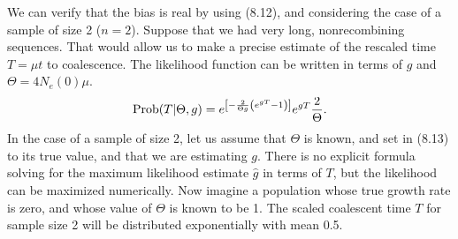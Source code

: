 We can verify that the bias is real by using (8.12), and considering the case
of a sample of size 2 ($n = 2$).  Suppose that we had very long, nonrecombining
sequences.  That would allow us to make a precise estimate of the
rescaled time $T = \mu t$ to coalescence.  The likelihood function can be written
in terms of $g$ and $\Theta = 4N_e(0)\mu$.
\begin{equation} %
\Prob(T |\Theta, g) =  e^{\left[-\frac{2}{\Theta g}\left(e^{gT}-1\right)\right]} e^{gT} \frac{2}{\Theta}.
\end{equation}
In the case of a sample of size 2, let us assume that $\Theta$ is known, and set
in (8.13) to its true value, and that we are estimating $g$.  There is no
explicit formula solving for the maximum likelihood estimate $\hat{g}$
in terms of $T$, but the likelihood can be maximized numerically.
Now imagine a population whose true growth rate is zero, and whose
value of $\Theta$ is known to be 1.  The scaled coalescent time $T$ for
sample size 2 will be distributed exponentially with mean 0.5.

